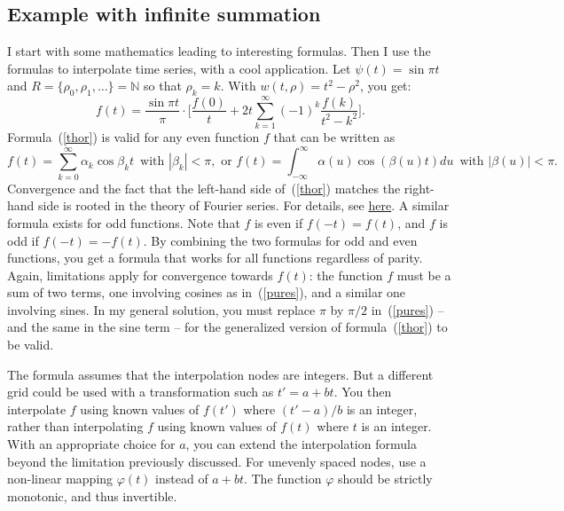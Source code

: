 \documentclass[oneside,10pt]{book}
\begin{document}

\subsection{Example with infinite summation} \label{puner}

I start with some mathematics leading to interesting formulas. Then I use the formulas to interpolate time series, with a cool 
 application. Let $\psi(t)=\sin\pi t$ and $R = \{\rho_0, \rho_1, \dots\} = \mathbb{N}$ so that $\rho_k = k$. With 
$w(t,\rho)=t^2 - \rho^2$, you get:
\begin{equation}
f(t) =\frac{\sin\pi t}{\pi} \cdot \Bigg[\frac{f(0)}{t} + 2t \sum_{k=1}^\infty (-1)^k \frac{f(k)}{t^2-k^2}\Bigg].\label{thor}
\end{equation}
Formula~(\ref{thor}) is valid for any even function $f$ that can be written as 
\begin{equation}
f(t) = \sum_{k=0}^\infty \alpha_k \cos \beta_k t \, \text{ with } |\beta_k|<\pi, \text{ or } 
f(t) = \int_{-\infty}^\infty \alpha(u)\cos(\beta(u)t )du \, \text{ with } |\beta(u)|<\pi. \label{pures}
\end{equation}
Convergence and the fact that the left-hand side of~(\ref{thor}) matches the right-hand side is rooted in the theory of Fourier series. 
For details, see \href{https://mathoverflow.net/questions/438157/convergence-of-series-related-to-partial-fraction-expansion-of-cotangent-functio}{here}. A similar formula exists for odd functions. Note that $f$ is even if $f(-t)=f(t)$, and $f$ is odd 
if $f(-t)=-f(t)$. By combining the two formulas for odd and even functions, you get a formula that works for all functions regardless of parity. Again, limitations apply for convergence towards $f(t)$: the function $f$ must be a sum of two terms, one involving cosines as in~(\ref{pures}), and a similar one involving sines. In my general solution, you must replace $\pi$ by $\pi/2$ 
 in~(\ref{pures}) -- and the same in the sine term -- for the generalized version of formula~(\ref{thor}) to be valid. 

The formula assumes that the \textcolor{index}{interpolation nodes} 
are integers. But a different grid could be used with a transformation such as $t'=a+bt$. You then
 interpolate $f$ using known values of $f(t')$ where $(t'-a)/b$ is an integer, rather than interpolating $f$ using known values of $f(t)$ where $t$ is an integer. With an appropriate choice for $a$,  you can extend the interpolation formula beyond the limitation previously discussed. For unevenly spaced nodes, use a non-linear mapping
 $\varphi(t)$ instead of $a+bt$. The function $\varphi$ should be strictly monotonic, and thus invertible.
\end{document}
